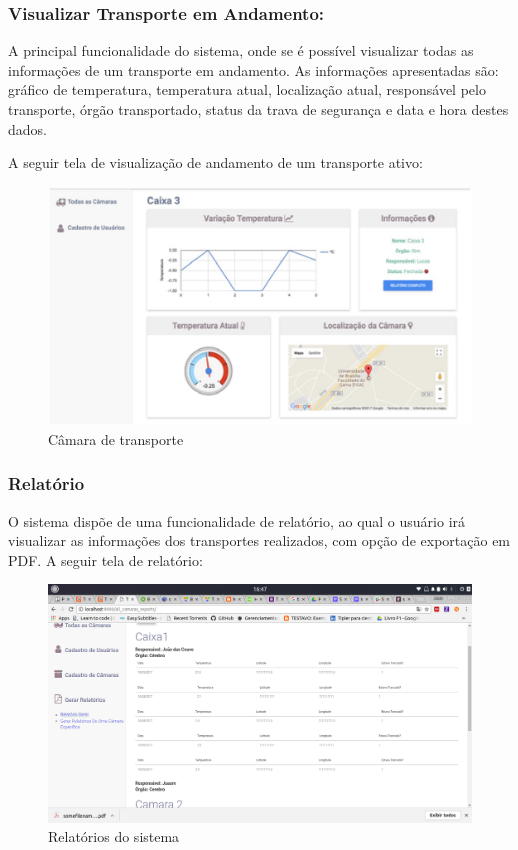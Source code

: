 \subsubsection{Visualizar Transporte em Andamento:}
	A principal funcionalidade do sistema, onde se é possível visualizar todas as informações de um transporte em andamento. As informações apresentadas são: gráfico de temperatura, temperatura atual, localização atual, responsável pelo transporte, órgão transportado, status da trava de segurança e data e hora destes dados.

	A seguir tela de visualização de andamento de um transporte ativo:

\begin{figure}[H]
\centering
\includegraphics[width=16cm]{figuras/camara_software.jpg}
\caption{Câmara de transporte}
\end{figure}

\subsubsection{Relatório}
	O sistema dispõe de uma funcionalidade de relatório, ao qual o usuário irá visualizar as informações dos transportes realizados, com opção de exportação em PDF.
	A seguir tela de relatório:
\begin{figure}[H]
\centering
\includegraphics[width=16cm]{figuras/relatorio_software.png}
\caption{Relatórios do sistema}
\end{figure}

